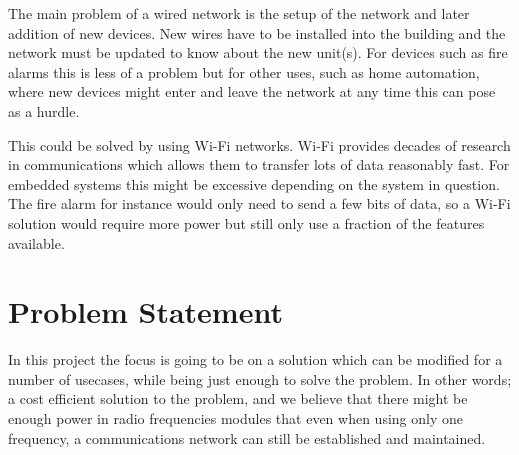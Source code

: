 The main problem of a wired network is the setup of the network and later addition of new devices. 
New wires have to be installed into the building and the network must be updated to know about the new unit(s).
For devices such as fire alarms this is less of a problem but for other uses, such as home automation, where new devices might enter and leave the network at any time this can pose as a hurdle.

This could be solved by using Wi-Fi networks.
Wi-Fi provides decades of research in communications which allows them to transfer lots of data reasonably fast.
For embedded systems this might be excessive depending on the system in question.
The fire alarm for instance would only need to send a few bits of data, so a Wi-Fi solution would require more power but still only use a fraction of the features available.






\section{Problem Statement}\label{sec:problemStatement}

In this project the focus is going to be on a solution which can be modified for a number of usecases, while being just enough to solve the problem.
In other words; a cost efficient solution to the problem, and we believe that there might be enough power in radio frequencies modules that even when using only one frequency, a communications network can still be established and maintained.

